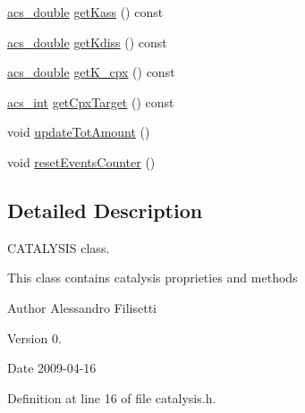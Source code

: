 \begin{DoxyCompactItemize}
\hyperlink{a00066_ab776853a005fcbf56af0424a2a4dd607}{acs\-\_\-double} \hyperlink{a00006_a471d98737d6708b3ac03efba41082d0c}{get\-Kass} () const 
\item 
\hyperlink{a00066_ab776853a005fcbf56af0424a2a4dd607}{acs\-\_\-double} \hyperlink{a00006_ad8b0d5f6410e2256cfefe0db9a10b0af}{get\-Kdiss} () const 
\item 
\hyperlink{a00066_ab776853a005fcbf56af0424a2a4dd607}{acs\-\_\-double} \hyperlink{a00006_a182bfb05b12ddd3613693f6d1f362665}{get\-K\-\_\-cpx} () const 
\item 
\hyperlink{a00066_a8d277355641a098190360234e2ebde35}{acs\-\_\-int} \hyperlink{a00006_a95cce06ac3f63b66d984bd723ab7e561}{get\-Cpx\-Target} () const 
\item 
void \hyperlink{a00006_a9c90e6f2cd9aafd2029ef20a09b95eb2}{update\-Tot\-Amount} ()
\item 
void \hyperlink{a00006_ab8964f8ec17d677de03747520d0a9995}{reset\-Events\-Counter} ()
\end{DoxyCompactItemize}


\subsection{Detailed Description}
C\-A\-T\-A\-L\-Y\-S\-I\-S class. 

This class contains catalysis proprieties and methods \begin{DoxyAuthor}{Author}
Alessandro Filisetti 
\end{DoxyAuthor}
\begin{DoxyVersion}{Version}
0. 
\end{DoxyVersion}
\begin{DoxyDate}{Date}
2009-\/04-\/16 
\end{DoxyDate}


Definition at line 16 of file catalysis.\-h.



